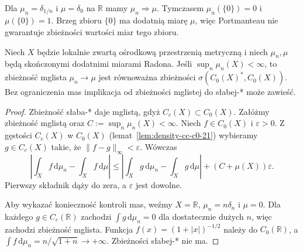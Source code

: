 \begin{przyklad}
Dla $\mu_n=\delta_{1/n}$ i $\mu=\delta_0$ na
$\mathbb R$ mamy $\mu_n\Rightarrow\mu$.
Tymczasem $\mu_n(\{0\})=0$ i $\mu(\{0\})=1$.
Brzeg zbioru $\{0\}$ ma dodatnią miarę $\mu$,
więc Portmanteau nie gwarantuje zbieżności
wartości miar tego zbioru.
\end{przyklad}

\begin{wniosek}
\label{cor:vague-c0-bounded-22}
Niech $X$ będzie lokalnie zwartą ośrodkową przestrzenią
metryczną i niech $\mu_n,\mu$ będą skończonymi dodatnimi
miarami Radona. Jeśli $\sup_n\mu_n(X)<\infty$, to
zbieżność mglista $\mu_n\to\mu$ jest równoważna zbieżności
$\sigma(C_0(X)^*,C_0(X))$.
Bez ograniczenia mas implikacja od zbieżności mglistej
do słabej-* może zawieść.
\end{wniosek}
\begin{proof}
Zbieżność słaba-* daje mglistą, gdyż $C_c(X)\subset C_0(X)$.
Załóżmy zbieżność mglistą oraz $C:=\sup_n\mu_n(X)<\infty$.
Niech $f\in C_0(X)$ i $\varepsilon>0$. Z gęstości
$C_c(X)$ w $C_0(X)$ (lemat~\ref{lem:density-cc-c0-21})
wybieramy $g\in C_c(X)$ takie, że
$\|f-g\|_\infty<\varepsilon$. Wówczas
\[
 \left|\int_X f\,\mathrm d\mu_n-\int_X f\,\mathrm d\mu\right|
 \le\left|\int_Xg\,\mathrm d\mu_n-\int_Xg\,\mathrm d\mu\right|
 +(C+\mu(X))\varepsilon.
\]
Pierwszy składnik dąży do zera, a $\varepsilon$ jest dowolne.

Aby wykazać konieczność kontroli mas, weźmy
$X=\mathbb R$, $\mu_n=n\delta_n$ i $\mu=0$.
Dla każdego $g\in C_c(\mathbb R)$ zachodzi
$\int g\,\mathrm d\mu_n=0$ dla dostatecznie dużych $n$,
więc zachodzi zbieżność mglista. Funkcja
$f(x)=(1+|x|)^{-1/2}$ należy do $C_0(\mathbb R)$,
a $\int f\,\mathrm d\mu_n=n/\sqrt{1+n}\to+\infty$.
Zbieżności słabej-* nie ma.
\end{proof}

